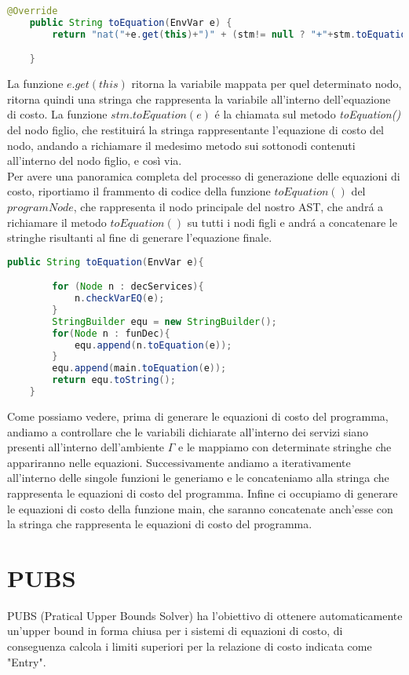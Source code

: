 \documentclass[../../main.tex]{subfiles}
\begin{document}
\begin{lstlisting}[language=Java]
    @Override
    public String toEquation(EnvVar e) {
        return "nat("+e.get(this)+")" + (stm!= null ? "+"+stm.toEquation(e) : "");

    }
\end{lstlisting}

La funzione $e.get(this)$ ritorna la variabile mappata per quel determinato nodo, ritorna quindi una stringa che rappresenta la variabile all'interno dell'equazione di costo. La funzione $stm.toEquation(e)$ é la chiamata sul metodo \textit{toEquation()} del nodo figlio, che restituirá la stringa rappresentante l'equazione di costo del nodo, andando a richiamare il medesimo metodo sui sottonodi contenuti all'interno del nodo figlio, e così via.\\
Per avere una panoramica completa del processo di generazione delle equazioni di costo, riportiamo il frammento di codice della funzione $toEquation()$ del $programNode$, che rappresenta il nodo principale del nostro AST, che andrá a richiamare il metodo $toEquation()$ su tutti i nodi figli e andrá a concatenare le stringhe risultanti al fine di generare l'equazione finale.
\begin{lstlisting}[language=Java, caption={toEquation() del ProgramNode}]
    public String toEquation(EnvVar e){

        for (Node n : decServices){
            n.checkVarEQ(e);
        }
        StringBuilder equ = new StringBuilder();
        for(Node n : funDec){
            equ.append(n.toEquation(e));
        }
        equ.append(main.toEquation(e));
        return equ.toString();
    }
\end{lstlisting}

Come possiamo vedere, prima di generare le equazioni di costo del programma, andiamo a controllare che le variabili dichiarate all'interno dei servizi siano presenti all'interno dell'ambiente $\varGamma$ e le mappiamo con determinate stringhe che appariranno nelle equazioni. Successivamente andiamo a iterativamente all'interno delle singole funzioni le generiamo e le concateniamo alla stringa che rappresenta le equazioni di costo del programma.
Infine ci occupiamo di generare le equazioni di costo della funzione main, che saranno concatenate anch'esse con la stringa che rappresenta le equazioni di costo del programma.

\section{PUBS}
\label{sec:pubs}
PUBS (Pratical Upper Bounds Solver) ha l'obiettivo di ottenere automaticamente un'upper bound in forma chiusa per i sistemi di equazioni di costo, di conseguenza calcola i limiti superiori per la relazione di costo indicata come "Entry".
\end{document}
